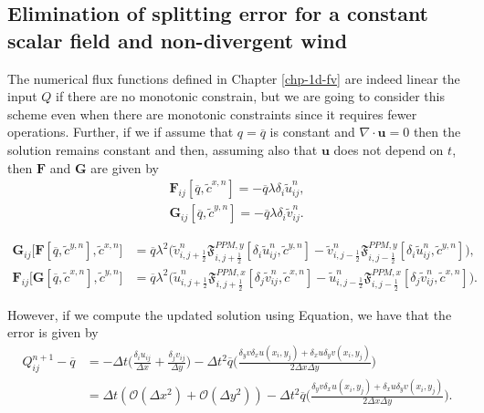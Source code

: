 \subsection{Elimination of splitting error for a constant scalar field and non-divergent wind}
The numerical flux functions defined in Chapter \ref{chp-1d-fv} are indeed linear the 
input $Q$ if there are no monotonic constrain, but we are going to consider this scheme
even when there are monotonic constraints since it requires fewer operations.
Further, if we if assume that $q = \overline{q}$ is constant and $\nabla \cdot 
\boldsymbol{u} = 0$ then the solution remains constant and then, assuming also that
$\boldsymbol{u}$ does not depend on $t$, then $\mathbf{F}$ and $\mathbf{G}$ are given by
\begin{align*}
	\mathbf{F}_{ij}[\overline{q},\tilde{c}^{x,n}] = -\overline{q} \lambda {\delta_i} \tilde{u}_{ij}^n,\\
	\mathbf{G}_{ij}[\overline{q},\tilde{c}^{y,n}] = -\overline{q} \lambda {\delta_i} \tilde{v}_{ij}^n.
\end{align*}

\begin{align*}
\mathbf{G}_{ij}\big[\mathbf{F}[{\overline{q},\tilde{c}^{y,n}}],\tilde{c}^{x,n}\big] &= 
   \overline{q}\lambda^2 \bigg(
   \tilde{v}_{i,j+\frac{1}{2}}^n\mathfrak{F}_{i,j+\frac{1}{2}}^{PPM,y}[ {\delta_i} \tilde{u}_{ij}^n,\tilde{c}^{y,n}] 
-  \tilde{v}_{i,j-\frac{1}{2}}^n\mathfrak{F}_{i,j-\frac{1}{2}}^{PPM,y}[ {\delta_i} \tilde{u}_{ij}^n,\tilde{c}^{y,n}]\bigg),\\
\mathbf{F}_{ij}\big[\mathbf{G}[{\overline{q},\tilde{c}^{x,n}}],\tilde{c}^{y,n}\big] &= 
   \overline{q}\lambda^2 \bigg(
   \tilde{u}_{i,j+\frac{1}{2}}^n\mathfrak{F}_{i,j+\frac{1}{2}}^{PPM,x}[ {\delta_j} \tilde{v}_{ij}^n,\tilde{c}^{x,n}] 
-  \tilde{u}_{i,j-\frac{1}{2}}^n\mathfrak{F}_{i,j-\frac{1}{2}}^{PPM,x}[ {\delta_j} \tilde{v}_{ij}^n,\tilde{c}^{x,n}]\bigg).
\end{align*}

However, if we compute the updated solution using Equation, we have that the error is given by
\begin{align}
	\label{chp-adv2d-AL-error}
	Q^{n+1}_{ij} - \overline{q} &= 
	-\Delta t \bigg(\frac{\delta_i u_{ij}}{\Delta x} + \frac{\delta_j v_{ij}}{\Delta y} \bigg)
	-\Delta t^2 \overline{q}\bigg( \frac{\delta_y v \delta_x u(x_i,y_j) + \delta_x u\delta_y v(x_i,y_j)}{2\Delta x \Delta y} \bigg) \\
	&= \Delta t (\mathcal{O}(\Delta x^2) + \mathcal{O}(\Delta y^2))
	   -\Delta t^2 \overline{q}\bigg( \frac{\delta_y v \delta_x u(x_i,y_j) + \delta_x u\delta_y v(x_i,y_j)}{2\Delta x \Delta y} \bigg).
\end{align}


